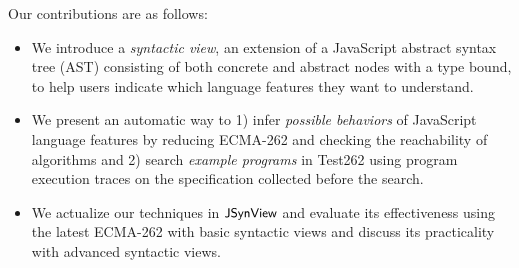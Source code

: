 Our contributions are as follows:
\begin{itemize}
  \item We introduce a \textit{syntactic view}, an extension of a JavaScript
    abstract syntax tree (AST) consisting of both concrete and abstract nodes
    with a type bound, to help users indicate which language features they want
    to understand.

  \item We present an automatic way to 1) infer \textit{possible behaviors} of
    JavaScript language features by reducing ECMA-262 and checking the
    reachability of algorithms and 2) search \textit{example programs} in
    Test262 using program execution traces on the specification collected before
    the search.

  \item We actualize our techniques in $\textsf{\small JSynView}$ and evaluate its effectiveness
    using the latest ECMA-262 with  basic syntactic views and discuss
    its practicality with  advanced syntactic views.
\end{itemize}
